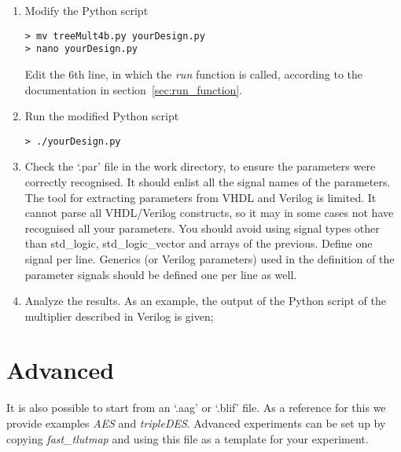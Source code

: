 \documentclass[a4paper]{memoir}
\begin{document}
\begin{enumerate}
\item Modify the Python script\\
\begin{lstlisting}
> mv treeMult4b.py yourDesign.py
> nano yourDesign.py
\end{lstlisting}
Edit the 6th line, in which the \emph{run} function is called, according to the documentation in section~\ref{sec:run_function}.
\item Run the modified Python script
\begin{lstlisting}
> ./yourDesign.py
\end{lstlisting}
\item \label{sec:check_par}Check the `.par' file in the work directory, to ensure the parameters were correctly recognised. It should enlist all the signal names of the parameters. \\
The tool for extracting parameters from VHDL and Verilog is limited. It cannot parse all VHDL/Verilog constructs, so it may in some cases not have recognised all your parameters. You should avoid using signal types other than std\_logic, std\_logic\_vector and arrays of the previous. Define one signal per line. Generics (or Verilog parameters) used in the definition of the parameter signals should be defined one per line as well.

\item Analyze the results. As an example, the output of the Python script of the multiplier described in Verilog is given;\\

\end{enumerate}

\section{Advanced}
It is also possible to start from an `.aag' or `.blif' file. As a reference for this we provide examples \emph{AES} and \emph{tripleDES}. 
Advanced experiments can be set up by copying \emph{fast\_tlutmap} and using this file as a template for your experiment.

\clearpage
\end{document}
